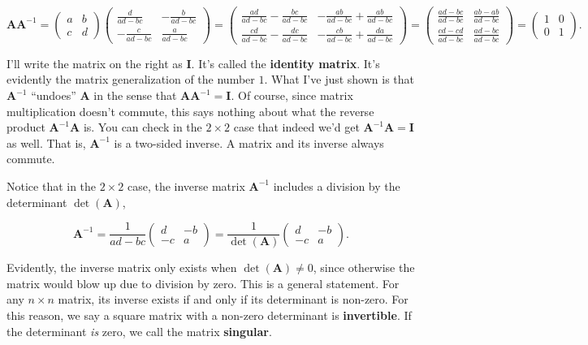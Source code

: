 \documentclass[
  letterpaper,
  DIV=11,
  numbers=noendperiod]{scrreprt}
\begin{document}
\[
\mathbf{A}\mathbf{A}^{-1} = 
\begin{pmatrix}
a & b \\
c & d
\end{pmatrix}
\begin{pmatrix}
\frac{d}{ad-bc} & -\frac{b}{ad-bc} \\
-\frac{c}{ad-bc} & \frac{a}{ad-bc}
\end{pmatrix} = 
\begin{pmatrix}
\frac{ad}{ad-bc}-\frac{bc}{ad-bc} & -\frac{ab}{ad-bc}+\frac{ab}{ad-bc} \\
\frac{cd}{ad-bc}-\frac{dc}{ad-bc} & -\frac{cb}{ad-bc}+\frac{da}{ad-bc}
\end{pmatrix} = 
\begin{pmatrix}
\frac{ad-bc}{ad-bc} & \frac{ab-ab}{ad-bc} \\
\frac{cd-cd}{ad-bc} & \frac{ad-bc}{ad-bc}
\end{pmatrix} = 
\begin{pmatrix}
1 & 0 \\
0 & 1
\end{pmatrix}.
\]

I'll write the matrix on the right as \(\mathbf{I}\). It's called the
\textbf{identity matrix}. It's evidently the matrix generalization of
the number \(1\). What I've just shown is that \(\mathbf{A}^{-1}\)
``undoes'' \(\mathbf{A}\) in the sense that
\(\mathbf{A}\mathbf{A}^{-1} = \mathbf{I}\). Of course, since matrix
multiplication doesn't commute, this says nothing about what the reverse
product \(\mathbf{A}^{-1}\mathbf{A}\) is. You can check in the
\(2 \times 2\) case that indeed we'd get
\(\mathbf{A}^{-1}\mathbf{A} = \mathbf{I}\) as well. That is,
\(\mathbf{A}^{-1}\) is a two-sided inverse. A matrix and its inverse
always commute.

Notice that in the \(2 \times 2\) case, the inverse matrix
\(\mathbf{A}^{-1}\) includes a division by the determinant
\(\det(\mathbf{A})\),

\[
\mathbf{A}^{-1} = 
\frac{1}{ad-bc}
\begin{pmatrix}
d & -b \\
-c & a
\end{pmatrix} = 
\frac{1}{\det(\mathbf{A})}
\begin{pmatrix}
d & -b \\
-c & a
\end{pmatrix}.
\]

Evidently, the inverse matrix only exists when
\(\det(\mathbf{A}) \neq 0\), since otherwise the matrix would blow up
due to division by zero. This is a general statement. For any
\(n \times n\) matrix, its inverse exists if and only if its determinant
is non-zero. For this reason, we say a square matrix with a non-zero
determinant is \textbf{invertible}. If the determinant \emph{is} zero,
we call the matrix \textbf{singular}.
\end{document}
